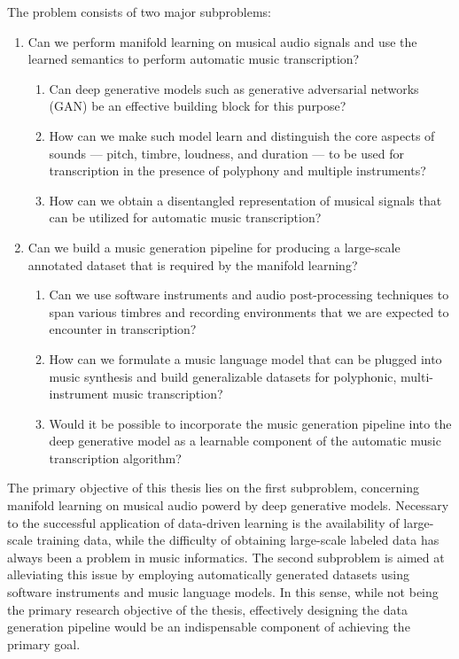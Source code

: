 The problem consists of two major subproblems:

\vspace{1em}

\begin{enumerate}
	\item Can we perform manifold learning on musical audio signals and use the learned semantics to perform automatic music transcription?
	\begin{enumerate}
		\item Can deep generative models such as generative adversarial networks (GAN) be an effective building block for this purpose?
		\item How can we make such model learn and distinguish the core aspects of sounds --- pitch, timbre, loudness, and duration --- to be used for transcription in the presence of polyphony and multiple instruments?
		\item How can we obtain a disentangled representation of musical signals that can be utilized for automatic music transcription?
	\end{enumerate}
	\item Can we build a music generation pipeline for producing a large-scale annotated dataset that is required by the manifold learning?
	\begin{enumerate}
		\item Can we use software instruments and audio post-processing techniques to span various timbres and recording environments that we are expected to encounter in transcription?
		\item How can we formulate a music language model that can be plugged into music synthesis and build generalizable datasets for polyphonic, multi-instrument music transcription?
		\item Would it be possible to incorporate the music generation pipeline into the deep generative model as a learnable component of the automatic music transcription algorithm?
	\end{enumerate}
\end{enumerate}

\vspace{1em}

The primary objective of this thesis lies on the first subproblem, concerning manifold learning on musical audio powerd by deep generative models.
Necessary to the successful application of data-driven learning is the availability of large-scale training data, while the difficulty of obtaining large-scale labeled data has always been a problem in music informatics.
The second subproblem is aimed at alleviating this issue by employing automatically generated datasets using software instruments and music language models.
In this sense, while not being the primary research objective of the thesis, effectively designing the data generation pipeline would be an indispensable component of achieving the primary goal.

